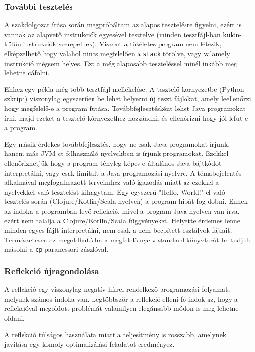 \subsubsection{További tesztelés}

A szakdolgozat írása során megpróbáltam az alapos tesztelésre figyelni, ezért is vannak az alapvető instrukciók egyesével tesztelve (minden tesztfájl-ban külön-külön instrukciók szerepelnek). Viszont a tökéletes program nem létezik, elképzelhető hogy valahol nincs megfelelően a \lstinline{stack} törölve, vagy valamely instrukció mégsem helyes. Ezt a még alaposabb teszteléssel minél inkább meg lehetne cáfolni.

Ehhez egy példa még több tesztfájl mellékelése. A tesztelő környezetbe (Python szkript) viszonylag egyszerűen be lehet helyezni új teszt fájlokat, amely leellenőrzi hogy megfelelő-e a program futása. Továbbfejlesztésként lehet Java programokat írni, majd ezeket a tesztelő környezethez hozzáadni, és ellenőrizni hogy jól lefut-e a program.

Egy másik érdekes továbbfejlesztés, hogy ne csak Java programokat írjunk, hanem más JVM-et felhasználó nyelvekben is írjunk programokat. Ezekkel ellenőrizhetjük hogy a program tényleg képes-e általános Java bájtkódot interpretálni, vagy csak limitált a Java programozási nyelvre. A témabejelentés alkalmával megfogalmazott terveimhez való igazodás miatt az ezekkel a nyelvekkel való tesztelést kihagytam. Egy egyszerű "Hello, World!"-el való tesztelés során (Clojure/Kotlin/Scala nyelven) a program hibát fog dobni. Ennek az indoka a programban levő reflekció, mivel a program Java nyelven van írva, ezért nem találja a Clojure/Kotlin/Scala függvényeket. Helyette érdemes lenne minden egyes fájlt interpretálni, nem csak a nem beépített osztályok fájlait. Természetesen ez megoldható ha a megfelelő nyelv standard könyvtárát be tudjuk másolni a \lstinline{cp} parancssori zászlóval.

\subsubsection{Reflekció újragondolása}

A reflekció egy viszonylag negatív hírrel rendelkező programozási folyamat, melynek számos indoka van. Legtöbbször a reflekció elleni fő indok az, hogy a reflekcióval megoldott problémát valamilyen elegánsabb módon is meg lehetne oldani.

A reflekció túlságos használata miatt a teljesítmény is rosszabb, amelynek javítása egy komoly optimalizálási feladatot eredményez.

